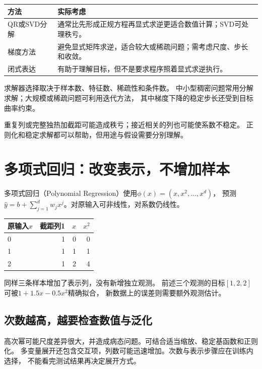 \begin{center}
\begin{tabularx}{\textwidth}{P{35mm}Y}
\toprule
方法 & 实际考虑\\
\midrule
QR或SVD分解 & 通常比先形成正规方程再显式求逆更适合数值计算；SVD可处理秩亏。\\
梯度方法 & 避免显式矩阵求逆，适合较大或稀疏问题；需考虑尺度、步长和收敛。\\
闭式表达 & 有助于理解目标，但不是要求程序照着显式求逆执行。\\
\bottomrule
\end{tabularx}
\end{center}

求解器选择取决于样本数、特征数、稀疏性和条件数。
中小型稠密问题常用分解求解；大规模或稀疏问题可利用迭代方法，
其中梯度下降的稳定步长还受到目标曲率约束。

\begin{pitfall}[相关列与数值稳定性]
重复列或完整独热加截距可能造成秩亏；接近相关的列也可能使系数不稳定。
正则化和稳定求解都可以帮助，但用途与假设需要分别理解。
\end{pitfall}



\section{多项式回归：改变表示，不增加样本}
\label{sec:linear-polynomial}
多项式回归（Polynomial Regression）使用$\phi(x)=(x,x^2,\ldots,x^d)$，
预测$\hat y=b+\sum_{j=1}^dw_jx^j$。对原输入可非线性，对系数仍线性。

\begin{center}
\begin{tabular}{lrrr}
\toprule
原输入$x$ & 截距列1 & $x$ & $x^2$\\
\midrule
0 & 1 & 0 & 0\\
1 & 1 & 1 & 1\\
2 & 1 & 2 & 4\\
\bottomrule
\end{tabular}
\end{center}
同样三条样本增加了表示列，没有新增独立观测。
前述三个观测的目标$[1,2,2]$可被$1+1.5x-0.5x^2$精确拟合，
新数据上的误差则需要额外观测估计。

\subsection{次数越高，越要检查数值与泛化}
高次幂可能尺度差异很大，并造成病态问题。可结合适当缩放、稳定基函数和正则化。
多变量展开还包含交互项，列数可能迅速增加。次数与表示步骤应在训练内选择，
不能看完测试结果再决定展开方式。

